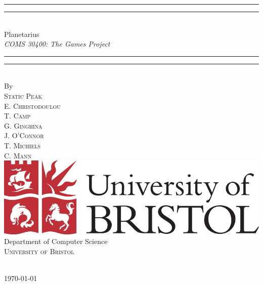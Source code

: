 \documentclass[11pt,a4paper]{article}
\begin{document}
\vspace*{13mm}
\begin{center}
\rule[0.5ex]{\linewidth}{2pt}\vspace*{-\baselineskip}\vspace*{3.2pt}
\rule[0.5ex]{\linewidth}{1pt}\\[\baselineskip]
{\Huge Planetarius }\\[4mm]
{\Large \textit{COMS  30400: The Games Project}}\\
\rule[0.5ex]{\linewidth}{1pt}\vspace*{-\baselineskip}\vspace{3.2pt}
\rule[0.5ex]{\linewidth}{2pt}\\
\vspace{6.5mm}
{\large By}\\
\vspace{6.5mm}
{\large\textsc{{\Huge Static Peak} \\E. Christodoulou\\ T. Camp\\ G. Ginghina\\ J. O'Connor\\ T. Michiels\\ C. Mann}}\\
\vspace{11mm}
\includegraphics[scale=0.2]{logos/brislogo.png}\\
\vspace{6mm}
{\large Department of Computer Science\\
\textsc{University of Bristol}}\\
\vspace{11mm}
\begin{minipage}{10cm}
\end{minipage}\\
\vspace{9mm}
{\large\textsc{\today}}
\vspace{12mm}
\end{center}
\begin{flushright}
\end{flushright}
\end{document}
